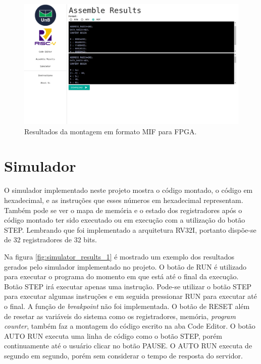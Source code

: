 	\begin{figure}[h]
	  \includegraphics[width=\linewidth]{img/assemble_data_mif.png}
	  \caption{Resultados da montagem em formato MIF para FPGA.}
	  \label{fig:assemble_data_mif}
	\end{figure}



\section{Simulador}

	O simulador implementado neste projeto mostra o código montado, o código em hexadecimal, e as instruções que esses números em hexadecimal representam. Também pode se ver o mapa de memória e o estado dos registradores após o código montado ter sido executado ou em execução com a utilização do botão STEP.  Lembrando que foi implementado a arquitetura RV32I, portanto dispõe-se de 32 registradores de 32 bits.

	Na figura \ref{fig:simulator_results_1} é mostrado um exemplo dos resultados gerados pelo simulador implementado no projeto. O botão de RUN é utilizado para executar o programa do momento em que está até o final da execução. Botão STEP irá executar apenas uma instrução. Pode-se utilizar o botão STEP para executar algumas instruções e em seguida pressionar RUN para executar até o final. A função de \textit{breakpoint} não foi implementada. O botão de RESET além de resetar as variáveis do sistema como os registradores, memória, \textit{program counter}, também faz a montagem do código escrito na aba Code Editor. O botão AUTO RUN executa uma linha de código como o botão STEP, porém continuamente até o usuário clicar no botão PAUSE. O AUTO RUN executa de segundo em segundo, porém sem considerar o tempo de resposta do servidor.

